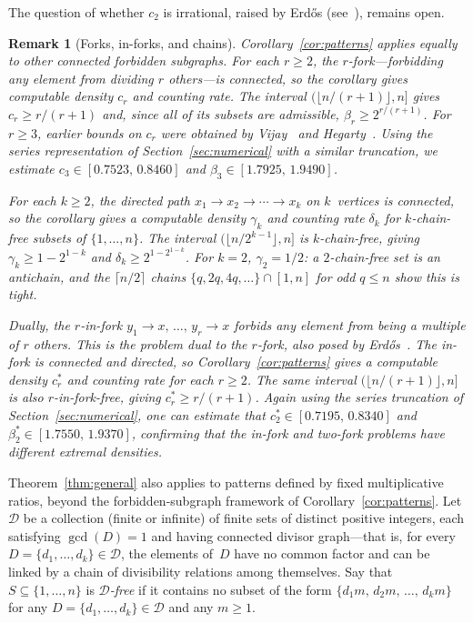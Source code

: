 \documentclass[11pt]{amsart}
\newtheorem{remark}[theorem]{Remark}
\begin{document}
The question of whether \(c_2\) is irrational, raised by Erd\H{o}s (see~\cite[Problem~B24]{Gu04}), remains open.

\begin{remark}[Forks, in-forks, and chains]\label{par:applications}\rm
Corollary~\ref{cor:patterns} applies equally to other connected forbidden subgraphs. For each \(r\ge 2\), the \(r\)-fork---forbidding any element from dividing \(r\) others---is connected, so the corollary gives computable density \(c_r\) and counting rate. The interval \((\lfloor n/(r+1)\rfloor,n]\) gives \(c_r\ge r/(r+1)\) and, since all of its subsets are admissible, \(\beta_r\ge 2^{r/(r+1)}\). For \(r\ge 3\), earlier bounds on \(c_r\) were obtained by Vijay~\cite{Vijay06} and Hegarty~\cite{Hegarty06}. Using the series representation of Section~\ref{sec:numerical} with a similar truncation, we estimate \(c_3\in[0.7523,\,0.8460]\) and \(\beta_3\in[1.7925,\,1.9490]\).

For each \(k\ge 2\), the directed path \(x_1\to x_2\to\cdots\to x_k\) on \(k\)~vertices is connected, so the corollary gives a computable density \(\gamma_k\) and counting rate \(\delta_k\) for \(k\)-chain-free subsets of \(\{1,\dots,n\}\). The interval \((\lfloor n/2^{k-1}\rfloor,n]\) is \(k\)-chain-free, giving \(\gamma_k\ge 1-2^{1-k}\) and \(\delta_k\ge 2^{1-2^{1-k}}\). For \(k=2\), \(\gamma_2=1/2\): a \(2\)-chain-free set is an antichain, and the \(\lceil n/2\rceil\) chains \(\{q,2q,4q,\dots\}\cap[1,n]\) for odd \(q\le n\) show this is tight.

Dually, the \(r\)-in-fork \(y_1\to x,\,\dots,\,y_r\to x\) forbids any element from being a multiple of \(r\) others. This is the problem dual to the \(r\)-fork, also posed by Erd\H{o}s~\cite[Problem~B24]{Gu04}. The in-fork is connected and directed, so Corollary~\ref{cor:patterns} gives a computable density \(c_r^*\) and counting rate for each \(r\ge 2\). The same interval \((\lfloor n/(r+1)\rfloor,n]\) is also \(r\)-in-fork-free, giving \(c_r^*\ge r/(r+1)\). Again using the series truncation of Section~\ref{sec:numerical}, one can estimate that \(c_2^*\in[0.7195,\,0.8340]\) and \(\beta_2^*\in[1.7550,\,1.9370]\), confirming that the in-fork and two-fork problems have different extremal densities.
\end{remark}

Theorem~\ref{thm:general} also applies to patterns defined by fixed multiplicative ratios, beyond the forbidden-subgraph framework of Corollary~\ref{cor:patterns}. Let \(\mathcal{D}\) be a collection (finite or infinite) of finite sets of distinct positive integers, each satisfying \(\gcd(D)=1\) and having connected divisor graph---that is, for every \(D=\{d_1,\dots,d_k\}\in\mathcal{D}\), the elements of~\(D\) have no common factor and can be linked by a chain of divisibility relations among themselves. Say that \(S\subseteq\{1,\dots,n\}\) is \emph{\(\mathcal{D}\)-free} if it contains no subset of the form \(\{d_1 m,\,d_2 m,\,\dots,\,d_k m\}\) for any \(D=\{d_1,\dots,d_k\}\in\mathcal{D}\) and any \(m\ge 1\).
\end{document}
